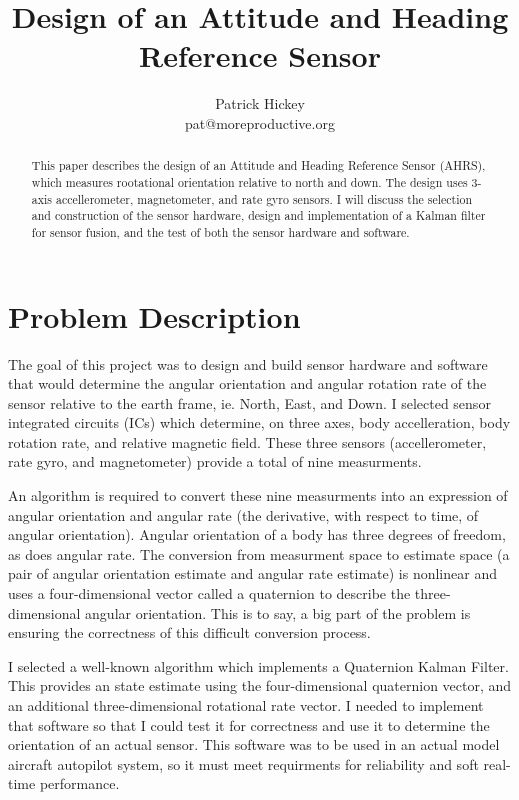 \documentclass[12pt]{report}
\begin{document}
%
\title{Design of an Attitude and Heading Reference Sensor}
\author{Patrick Hickey\\pat@moreproductive.org}


\begin{abstract}
This paper describes the design of an Attitude and Heading Reference Sensor (AHRS), which measures rootational orientation relative to north and down. 
The design uses 3-axis accellerometer, magnetometer, and rate gyro sensors. 
I will discuss the selection and construction of the sensor hardware, design and implementation of a Kalman filter for sensor fusion, and the test of both the sensor hardware and software.
\end{abstract}


\section{Problem Description}

The goal of this project was to design and build sensor hardware and software that would determine the angular orientation and angular rotation rate of the sensor relative to the earth frame, ie. North, East, and Down. I selected sensor integrated circuits (ICs) which determine, on three axes, body accelleration, body rotation rate, and relative magnetic field. These three sensors (accellerometer, rate gyro, and magnetometer) provide a total of nine measurments. 

An algorithm is required to convert these nine measurments into an expression of angular orientation and angular rate (the derivative, with respect to time, of angular orientation). Angular orientation of a body has three degrees of freedom, as does angular rate. The conversion from measurment space to estimate space (a pair of angular orientation estimate and angular rate estimate) is nonlinear and uses a four-dimensional vector called a quaternion to describe the three-dimensional angular orientation. This is to say, a big part of the problem is ensuring the correctness of this difficult conversion process.   

I selected a well-known algorithm which implements a Quaternion Kalman Filter. This provides an state estimate using the four-dimensional quaternion vector, and an additional three-dimensional rotational rate vector. I needed to implement that software so that I could test it for correctness and use it to determine the orientation of an actual sensor. This software was to be used in an actual model aircraft autopilot system, so it must meet requirments for reliability and soft real-time performance.
\end{document}
